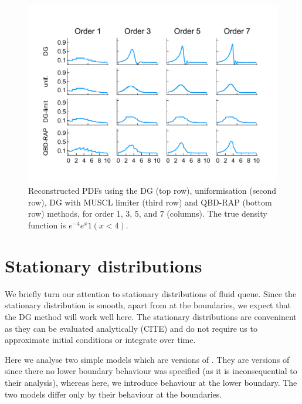 \begin{example}
\begin{figure}
		\includegraphics[width=\textwidth]{chapter6/figs/wave/fun1/pdf_formatted.pdf}
		\caption{Reconstructed PDFs using the DG (top row), uniformisation (second row), DG with MUSCL limiter (third row) and QBD-RAP (bottom row) methods, for order 1, 3, 5, and 7 (columns). The true density function is \(e^{-4}e^{x}1(x<4)\).} 
		\label{fig: pdf wave fun 1}
	\end{figure} 
\end{example} 

\FloatBarrier

\section{Stationary distributions} \label{sec:stat}
We briefly turn our attention to stationary distributions of fluid queue. Since the stationary distribution is smooth, apart from at the boundaries, we expect that the DG method will work well here. The stationary distributions are conveninent as they can be evaluated analytically (CITE) and do not require us to approximate initial conditions or integrate over time.

Here we analyse two simple models which are versions of \cite[Example 2]{bean2009}. They are versions of \cite[Example 2]{bean2009} since there no lower boundary behaviour was specified (as it is inconsequential to their analysis), whereas here, we introduce behaviour at the lower boundary. The two models differ only by their behaviour at the boundaries.

